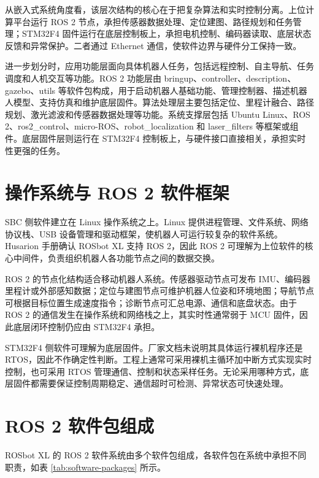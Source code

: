 \documentclass[UTF8,a4paper,12pt]{ctexrep}
\begin{document}
从嵌入式系统角度看，该层次结构的核心在于把复杂算法和实时控制分离。上位计算平台运行 ROS 2 节点，承担传感器数据处理、定位建图、路径规划和任务管理；STM32F4 固件运行在底层控制板上，承担电机控制、编码器读取、底层状态反馈和异常保护。二者通过 Ethernet 通信，使软件边界与硬件分工保持一致。

进一步划分时，应用功能层面向具体机器人任务，包括远程控制、自主导航、任务调度和人机交互等功能。ROS 2 功能层由 bringup、controller、description、gazebo、utils 等软件包构成，用于启动机器人基础功能、管理控制器、描述机器人模型、支持仿真和维护底层固件。算法处理层主要包括定位、里程计融合、路径规划、激光滤波和传感器数据处理等功能。系统支撑层包括 Ubuntu Linux、ROS 2、ros2\_control、micro-ROS、robot\_localization 和 laser\_filters 等框架或组件。底层固件层则运行在 STM32F4 控制板上，与硬件接口直接相关，承担实时性更强的任务。

\section{操作系统与 ROS 2 软件框架}

SBC 侧软件建立在 Linux 操作系统之上。Linux 提供进程管理、文件系统、网络协议栈、USB 设备管理和驱动框架，使机器人可运行较复杂的软件系统。Husarion 手册确认 ROSbot XL 支持 ROS 2，因此 ROS 2 可理解为上位软件的核心中间件，负责组织机器人各功能节点之间的数据交换。

ROS 2 的节点化结构适合移动机器人系统。传感器驱动节点可发布 IMU、编码器里程计或外部感知数据；定位与建图节点可维护机器人位姿和环境地图；导航节点可根据目标位置生成速度指令；诊断节点可汇总电源、通信和底盘状态。由于 ROS 2 的通信发生在操作系统和网络栈之上，其实时性通常弱于 MCU 固件，因此底层闭环控制仍应由 STM32F4 承担。

STM32F4 侧软件可理解为底层固件。厂家文档未说明其具体运行裸机程序还是 RTOS，因此不作确定性判断。工程上通常可采用裸机主循环加中断方式实现实时控制，也可采用 RTOS 管理通信、控制和状态采样任务。无论采用哪种方式，底层固件都需要保证控制周期稳定、通信超时可检测、异常状态可快速处理。

\section{ROS 2 软件包组成}

ROSbot XL 的 ROS 2 软件系统由多个软件包组成，各软件包在系统中承担不同职责，如表 \ref{tab:software-packages} 所示。
\end{document}
